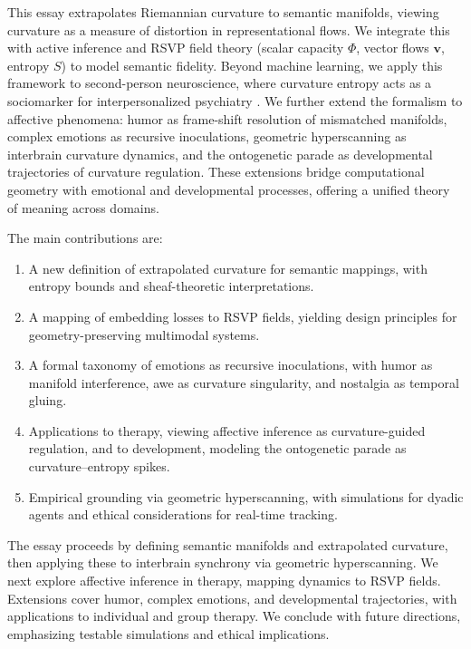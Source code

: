 \documentclass{article}
\theoremstyle{definition}
\begin{document}
This essay extrapolates Riemannian curvature to semantic manifolds, viewing curvature as a measure of distortion in representational flows. We integrate this with active inference \cite{friston2017graphical} and RSVP field theory (scalar capacity $\Phi$, vector flows $\mathbf{v}$, entropy $S$) to model semantic fidelity. Beyond machine learning, we apply this framework to second-person neuroscience, where curvature entropy acts as a sociomarker for interpersonalized psychiatry \cite{adel2025systematic}. We further extend the formalism to affective phenomena: humor as frame-shift resolution of mismatched manifolds, complex emotions as recursive inoculations, geometric hyperscanning as interbrain curvature dynamics, and the ontogenetic parade as developmental trajectories of curvature regulation. These extensions bridge computational geometry with emotional and developmental processes, offering a unified theory of meaning across domains.

The main contributions are:
\begin{enumerate}
  \item A new definition of extrapolated curvature for semantic mappings, with entropy bounds and sheaf-theoretic interpretations.
  \item A mapping of embedding losses to RSVP fields, yielding design principles for geometry-preserving multimodal systems.
  \item A formal taxonomy of emotions as recursive inoculations, with humor as manifold interference, awe as curvature singularity, and nostalgia as temporal gluing.
  \item Applications to therapy, viewing affective inference as curvature-guided regulation, and to development, modeling the ontogenetic parade as curvature–entropy spikes.
  \item Empirical grounding via geometric hyperscanning, with simulations for dyadic agents and ethical considerations for real-time tracking.
\end{enumerate}

The essay proceeds by defining semantic manifolds and extrapolated curvature, then applying these to interbrain synchrony via geometric hyperscanning. We next explore affective inference in therapy, mapping dynamics to RSVP fields. Extensions cover humor, complex emotions, and developmental trajectories, with applications to individual and group therapy. We conclude with future directions, emphasizing testable simulations and ethical implications.
\end{document}
